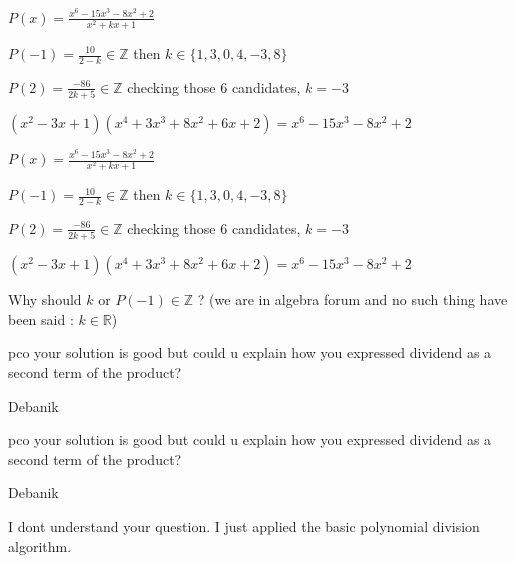 \begin{solution}
	$ P(x)=\frac{x^6 - 15x^3 - 8x^2 + 2}{x^2 + kx +1}$

$ P(-1)=\frac{10}{2-k}\in \mathbb{Z}$ then $ k \in \{1, 3, 0,4,-3,8\}$

$ P(2)=\frac{-86}{2k+5} \in \mathbb{Z}$ checking those $ 6$ candidates, $ k=-3$

$ (x^2-3x+1)(x^4+3x^3+8x^2+6x+2)=x^6 - 15x^3 - 8x^2 + 2$
\end{solution}



\begin{solution}
	\begin{tcolorbox}$ P(x) = \frac {x^6 - 15x^3 - 8x^2 + 2}{x^2 + kx + 1}$

$ P( - 1) = \frac {10}{2 - k}\in \mathbb{Z}$ then $ k \in \{1, 3, 0,4, - 3,8\}$

$ P(2) = \frac { - 86}{2k + 5} \in \mathbb{Z}$ checking those $ 6$ candidates, $ k = - 3$

$ (x^2 - 3x + 1)(x^4 + 3x^3 + 8x^2 + 6x + 2) = x^6 - 15x^3 - 8x^2 + 2$\end{tcolorbox}

Why should $ k$ or $ P(-1)\in \mathbb Z$ ? (we are in algebra forum and no such thing have been said : $ k\in\mathbb R$)
\end{solution}



\begin{solution}
	pco your solution is good but could u explain how you expressed dividend as a second term of the product?


\begin{bolded}Debanik\end{bolded}
\end{solution}



\begin{solution}
	\begin{tcolorbox}pco your solution is good but could u explain how you expressed dividend as a second term of the product?


\begin{bolded}Debanik\end{bolded}\end{tcolorbox}

I dont understand your question. I just applied the basic polynomial division algorithm.
\end{solution}



